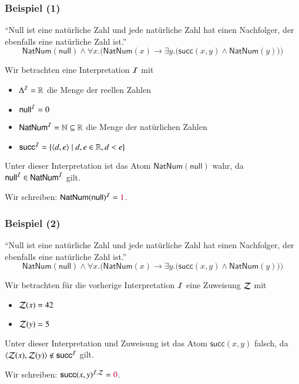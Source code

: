 \documentclass[onlymath]{beamer}
\begin{document}
\begin{frame}[t]\frametitle{Beispiel (1)}

\alert{"`Null ist eine natürliche Zahl und jede natürliche Zahl hat einen Nachfolger, der
ebenfalls eine natürliche Zahl ist."'}
\[ \textsf{NatNum}(\textsf{null})\wedge \forall x.\Big(\textsf{NatNum}(x)\to\exists y.\big(\textsf{succ}(x,y)\wedge \textsf{NatNum}(y)\big)\Big)\]

Wir betrachten eine Interpretation $\mathcal{I}$ mit
\begin{itemize}
\item $\Delta^{\mathcal{I}}=\mathbb{R}$ die Menge der reellen Zahlen
\item $\textsf{null}^{\mathcal{I}}=0$
\item $\textsf{NatNum}^{\mathcal{I}}=\mathbb{N}\subseteq\mathbb{R}$ die Menge der natürlichen Zahlen
\item $\textsf{succ}^{\mathcal{I}}=\{\langle{d,e}\rangle\mid d,e\in\mathbb{R},d<e\}$
\end{itemize}

Unter dieser Interpretation ist das Atom $\textsf{NatNum}(\textsf{null})$ wahr, da
$\textsf{null}^{\mathcal{I}}\in\textsf{NatNum}^{\mathcal{I}}$ gilt.
\smallskip

Wir schreiben: $\textsf{NatNum}(\textsf{null})^{\mathcal{I}}=\textcolor{purple}{1}$.

\end{frame}

\begin{frame}[t]\frametitle{Beispiel (2)}

\alert{"`Null ist eine natürliche Zahl und jede natürliche Zahl hat einen Nachfolger, der
ebenfalls eine natürliche Zahl ist."'}
\[ \textsf{NatNum}(\textsf{null})\wedge \forall x.\Big(\textsf{NatNum}(x)\to\exists y.\big(\textsf{succ}(x,y)\wedge \textsf{NatNum}(y)\big)\Big)\]

Wir betrachten für die vorherige Interpretation $\mathcal{I}$ 
eine Zuweisung $\mathcal{Z}$ mit
\begin{itemize}
\item $\mathcal{Z}(x)=42$
\item $\mathcal{Z}(y)=5$
\end{itemize}

Unter dieser Interpretation und Zuweisung ist das Atom $\textsf{succ}(x,y)$ falsch, da
$\langle{\mathcal{Z}(x),\mathcal{Z}(y)}\rangle\notin\textsf{succ}^{\mathcal{I}}$ gilt.
\smallskip

Wir schreiben: $\textsf{succ}(x,y)^{\mathcal{I},\mathcal{Z}}=\textcolor{purple}{0}$.
\bigskip


\end{frame}
\end{document}
